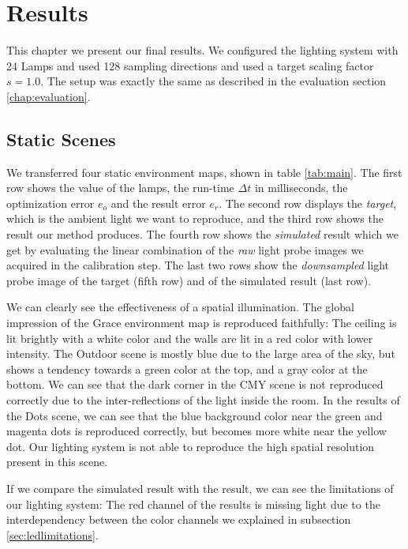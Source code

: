 
\chapter{Results}
 \label{chap:results}
  This chapter we present our final results. We configured the lighting system with 24 Lamps and used 128 sampling directions and used a target scaling factor $s=1.0$.
  The setup was exactly the same as described in the evaluation section \ref{chap:evaluation}.
  
\section{Static Scenes}
  We transferred four static environment maps, shown in table \ref{tab:main}.
  The first row shows the value of the lamps, the run-time $\Delta t$ in milliseconds, the optimization error $e_o$ and the result error $e_r$.
  The second row displays the \emph{target}, which is the ambient light we want to reproduce, and the third row shows the result our method produces.
  The fourth row shows the \emph{simulated} result which we get by evaluating the linear combination of the \emph{raw} light probe images we acquired in the calibration step.
  The last two rows show the \emph{downsampled} light probe image of the target (fifth row) and of the simulated result (last row). 
  
  We can clearly see the effectiveness of a spatial illumination.
  The global impression of the Grace environment map is reproduced faithfully: The ceiling is lit brightly with a white color and the walls are lit in a red color with lower intensity.
  The Outdoor scene is mostly blue due to the large area of the sky, but shows a tendency towards a green color at the top, and a gray color at the bottom.
  We can see that the dark corner in the CMY scene is not reproduced correctly due to the inter-reflections of the light inside the room.
  In the results of the Dots scene, we can see that the blue background color near the green and magenta dots is reproduced correctly, but becomes more white near the yellow dot.
  Our lighting system is not able to reproduce the high spatial resolution present in this scene.
  
  If we compare the simulated result with the result, we can see the limitations of our lighting system: 
  The red channel of the results is missing light due to the interdependency between the color channels we explained in subsection \ref{sec:ledlimitations}. 
    

